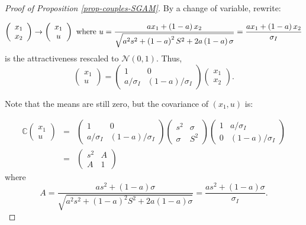 \documentclass[
  12pt,
]{article}
\theoremstyle{definition}
\theoremstyle{definition}
\theoremstyle{definition}
\theoremstyle{definition}
\theoremstyle{remark}
\begin{document}
\begin{proof}[Proof of Proposition \ref{prop-couples-SGAM}]

By a change of variable, rewrite:

\[
\left( 
\begin{array}{c}
x_{1} \\ 
x_{2}%
\end{array}%
\right) \rightarrow \left( 
\begin{array}{c}
x_{1} \\ 
u%
\end{array}%
\right) \text{ where }u=\frac{ax_{1}+\left( 1-a\right) x_{2}}{\sqrt{%
a^{2}s^{2}+\left( 1-a\right) ^{2}S^{2}+2a\left( 1-a\right) \sigma }}=
\frac{ax_{1}+\left( 1-a\right) x_{2}}{\sigma_I}
\]
is the attractiveness rescaled to $\mathcal{N}(0, 1)$. Thus,
\[
\left( 
\begin{array}{c}
x_{1} \\ 
u
\end{array}
\right) = \left( 
\begin{array}{cc}
1 & 0 \\ 
a/\sigma_I & (1-a)/\sigma_I%
\end{array}%
\right) \left( 
\begin{array}{c}
x_{1} \\ 
x_{2}%
\end{array}%
\right). 
\]


Note that the means are still zero, but the covariance of $(x_1,u)$ is:

\begin{eqnarray*}
\mathbb{C}\left( 
\begin{array}{c}
x_{1} \\ 
u
\end{array}
\right) &=&\left( 
\begin{array}{cc}
1 & 0 \\ 
a/\sigma_I & \left( 1-a\right)/\sigma_I%
\end{array}%
\right) \left( 
\begin{array}{cc}
s^{2} & \sigma \\ 
\sigma & S^{2}%
\end{array}%
\right) \left( 
\begin{array}{cc}
1 & a/\sigma_I \\ 
0 & \left( 1-a\right)/\sigma_I%
\end{array}%
\right) \\
&=&\left( 
\begin{array}{cc}
s^{2} &  A \\ 
A & 1 
\end{array}%
\right) \allowbreak 
\end{eqnarray*}
where
\[
A=\frac{
as^{2}+\left( 1-a\right) \sigma 
}{
\sqrt{
a^{2}s^{2} + (1-a)^2S^{2}
+ 2a\left(1-a\right)\sigma 
}} = 
\frac{as^{2}+\left( 1-a\right) \sigma }{\sigma_I}.
\]


\end{proof}
\end{document}
